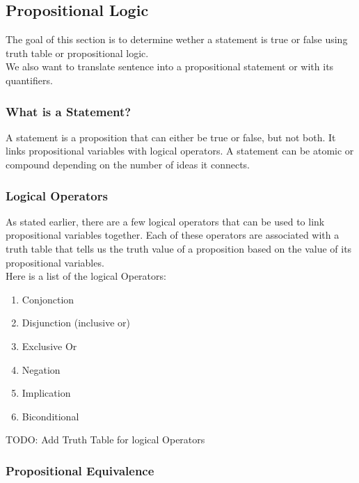 \documentclass{article}
\begin{document}
\subsection{Propositional Logic}

The goal of this section is to determine wether a statement is true or false
using truth table or propositional logic.\\

We also want to translate sentence into a propositional statement or with its
quantifiers.

\subsubsection{What is a Statement?}

A statement is a proposition that can either be true or false, but not both.
It links propositional variables with logical operators. A statement can be
atomic or compound depending on the number of ideas it connects.

\subsubsection{Logical Operators}

As stated earlier, there are a few logical operators that can be used to link
propositional variables together. Each of these operators are associated with
a truth table that tells us the truth value of a proposition based on the value
of its propositional variables.\\

Here is a list of the logical Operators:

\begin{enumerate}
    \item Conjonction
    \item Disjunction (inclusive or)
    \item Exclusive Or
    \item Negation
    \item Implication
    \item Biconditional
\end{enumerate}

TODO: Add Truth Table for logical Operators

\subsubsection{Propositional Equivalence}
\end{document}
